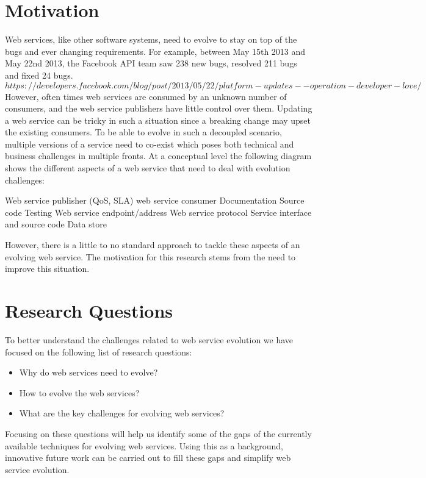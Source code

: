 \documentclass[runningheads,a4paper]{llncs}
\begin{document}
\section{Motivation} %
\label{sec:motivation}
Web services, like other software systems, need to evolve to stay on top of the bugs and ever changing requirements. For example, between May 15th 2013 and May 22nd 2013, the Facebook API team saw 238 new bugs, resolved 211 bugs and fixed 24 bugs. \[https://developers.facebook.com/blog/post/2013/05/22/platform-updates--operation-developer-love/\] However, often times web services are consumed by an unknown number of consumers, and the web service publishers have little control over them. Updating a web service can be tricky in such a situation since a breaking change may upset the existing consumers. To be able to evolve in such a decoupled scenario, multiple versions of a service need to co-exist which poses both technical and business challenges in multiple fronts. At a conceptual level the following diagram shows the different aspects of a web service that need to deal with evolution challenges:

Web service publisher (QoS, SLA)  web service consumer
Documentation                   Source code
Testing
Web service endpoint/address
Web service protocol
Service interface and source code
Data store

However, there is a little to no standard approach to tackle these aspects of an evolving web service. The motivation for this research stems from the need to improve this situation.


\section{Research Questions} %
\label{sec:research_questions}
To better understand the challenges related to web service evolution we have focused on the following list of research questions:

\begin{itemize}
  \item Why do web services need to evolve?
  \item How to evolve the web services?
  \item What are the key challenges for evolving web services?
\end{itemize}

Focusing on these questions will help us identify some of the gaps of the currently available techniques for evolving web services. Using this as a background, innovative future work can be carried out to fill these gaps and simplify web service evolution.
\end{document}
